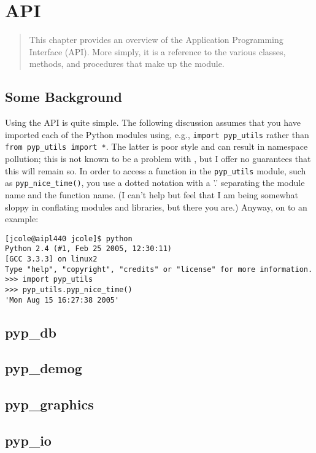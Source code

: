 \chapter{API}
\label{cha:api}

\begin{quote}
This chapter provides an overview of the \PYPEDAL{} Application Programming Interface (API).  More simply, it is a reference to the various classes, methods, and procedures that make up the \PYPEDAL{} module.
\end{quote}

\section{Some Background}
Using the \PyPedal{} API is quite simple.  The following discussion assumes that you have imported each of the Python modules using, e.g., \texttt{import pyp_utils} rather than \texttt{from pyp_utils import *}.  The latter is poor style and can result in namespace pollution; this is not known to be a problem with \PyPedal{}, but I offer no guarantees that this will remain so.  In order to access a function in the \texttt{pyp_utils} module, such as \texttt{pyp_nice_time()}, you use a dotted notation with a '.' separating the module name and the function name.  (I can't help but feel that I am being somewhat sloppy in conflating modules and libraries, but there you are.)  Anyway, on to an example:
\begin{verbatim}
[jcole@aipl440 jcole]$ python
Python 2.4 (#1, Feb 25 2005, 12:30:11)
[GCC 3.3.3] on linux2
Type "help", "copyright", "credits" or "license" for more information.
>>> import pyp_utils
>>> pyp_utils.pyp_nice_time()
'Mon Aug 15 16:27:38 2005'
\end{verbatim}

\section{pyp\_db}


\section{pyp\_demog}


\section{pyp\_graphics}


\section{pyp\_io}


